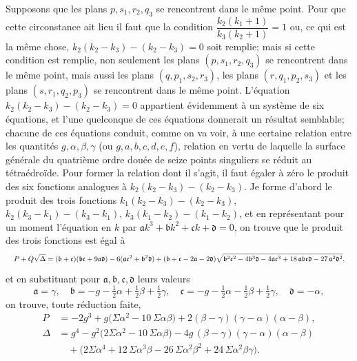 \documentclass[11pt]{article}
\begin{document}
Supposons que les plans $p, s_{1}, r_{2}, q_{3}$ se rencontrent dans le m\^eme point. Pour que cette circonstance ait lieu il faut que la condition $\dfrac{k_{2}(k_{1}+1)}{k_{3}(k_{2}+1)} = 1$ ou, ce qui est la m\^eme chose, $k_{2}(k_{2}-k_{3}) - (k_{2}-k_{3}) = 0$ soit remplie; mais si cette condition est remplie, non seulement les plans $(p, s_{1}, r_{2}, q_{3})$ se rencontrent dans le m\^eme point, mais aussi les plans $(q, p_{1}, s_{2}, r_{3})$, les plans $(r, q_{1}, p_{2}, s_{3})$ et les plans $(s, r_{1}, q_{2}, p_{3})$ se rencontrent dans le m\^eme point. L'\'equation $k_{2}(k_{2}-k_{3}) - (k_{2}-k_{3}) = 0$ appartient \'evidemment \`a un syst\`eme de six \'equations, et l'une quelconque de ces \'equations donnerait un r\'esultat semblable; chacune de ces \'equations conduit, comme on va voir, \`a une certaine relation entre les quantit\'es $g, \alpha, \beta, \gamma$ (ou $g, a, b, c, d, e, f$), relation en vertu de laquelle la surface g\'en\'erale du quatri\`eme ordre dou\'ee de seize points singuliers se r\'eduit au t\'etra\'edro\"ide. Pour former la relation dont il s'agit, il faut \'egaler \`a z\'ero le produit des six fonctions analogues \`a $k_{2}(k_{2}-k_{3}) - (k_{2}-k_{3})$. Je forme d'abord le produit des trois fonctions $k_{1}(k_{2}-k_{3}) - (k_{2}-k_{3})$, $k_{2}(k_{3}-k_{1}) - (k_{3}-k_{1})$, $k_{3}(k_{1}-k_{2}) - (k_{1}-k_{2})$, et en repr\'esentant pour un moment l'\'equation en $k$ par $\mathfrak{a} k^{3} + \mathfrak{b} k^{2} + \mathfrak{c} k + \mathfrak{d} = 0$, on trouve que le produit des trois fonctions est \'egal \`a
\[
\resizebox{\textwidth}{!}{$\displaystyle
P + Q\sqrt{\Delta} = (\mathfrak{b}+\mathfrak{c})(\mathfrak{b}\mathfrak{c} + 9\mathfrak{a}\mathfrak{d}) - 6(\mathfrak{a}\mathfrak{c}^{2} + \mathfrak{b}^{2}\mathfrak{d}) + (\mathfrak{b}+\mathfrak{c}-2\mathfrak{a}-2\mathfrak{d})\sqrt{\mathfrak{b}^{2}\mathfrak{c}^{2} - 4\mathfrak{b}^{3}\mathfrak{d} - 4\mathfrak{a}\mathfrak{c}^{3} + 18\,\mathfrak{a}\mathfrak{b}\mathfrak{c}\mathfrak{d} - 27\,\mathfrak{a}^{2}\mathfrak{d}^{2}},
$}
\]
et en substituant pour $\mathfrak{a}, \mathfrak{b}, \mathfrak{c}, \mathfrak{d}$ leurs valeurs
\[
\mathfrak{a} = \gamma,\quad \mathfrak{b} = -g - \tfrac{1}{2}\alpha + \tfrac{1}{2}\beta + \tfrac{1}{2}\gamma,\quad \mathfrak{c} = -g - \tfrac{1}{2}\alpha - \tfrac{1}{2}\beta + \tfrac{1}{2}\gamma,\quad \mathfrak{d} = -\alpha,
\]
on trouve, toute r\'eduction faite,
\begin{align*}
P &= -2 g^{3} + g\bigl(\Sigma \alpha^{2} - 10\,\Sigma \alpha\beta\bigr) + 2(\beta - \gamma)(\gamma - \alpha)(\alpha - \beta), \\
\Delta &= g^{4} - g^{2}\bigl(2 \Sigma \alpha^{2} - 10\,\Sigma \alpha\beta\bigr) - 4 g\,(\beta-\gamma)(\gamma-\alpha)(\alpha-\beta) \\
& \quad + \bigl(2 \Sigma \alpha^{4} + 12\,\Sigma \alpha^{3}\beta - 26\,\Sigma \alpha^{2}\beta^{2} + 24\,\Sigma \alpha^{2}\beta\gamma\bigr).
\end{align*}
\end{document}

